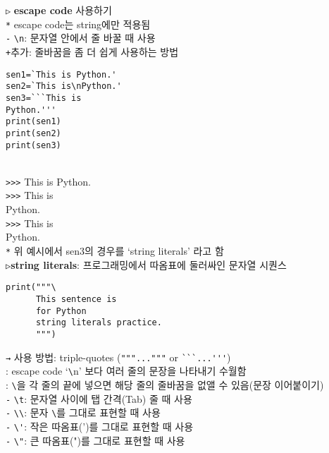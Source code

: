 \documentclass[11pt,a4paper]{article}
\begin{document}
\begin{spacing}{1.5}
\texttt{▷} \textbf{escape code} 사용하기\\
\hspace*{2em}\texttt{*} escape code는 string에만 적용됨\\
\texttt{-} \verb|\n|: 문자열 안에서 줄 바꿀 때 사용\\
\hspace*{2em}\texttt{+}추가: 줄바꿈을 좀 더 쉽게 사용하는 방법\\
\begin{lstlisting}[label={list:first},caption=escape code -- 줄 바꾸기]
sen1=`This is Python.'
sen2=`This is\nPython.'
sen3=```This is
Python.'''
print(sen1)
print(sen2)
print(sen3)
\end{lstlisting}\\
\verb|>>>| This is Python.\\
\verb|>>>| This is\\
Python.\\
\verb|>>>| This is\\
Python.\\

\hspace*{4em}\texttt{*} 위 예시에서 sen3의 경우를 `string literals' 라고 함\\
\hspace*{4em}\texttt{▷}\textbf{string literals}: 프로그래밍에서 따옴표에 둘러싸인 문자열 시퀀스
\begin{lstlisting}[label={list:first},caption=string literals]
print("""\
      This sentence is
      for Python
      string literals practice.
      """)
\end{lstlisting}
\hspace*{4em}\texttt{→} 사용 방법: triple-quotes (\verb|"""..."""| or \verb|```...'''|)\\
\hspace*{4em} : escape code `\verb|\|n' 보다 여러 줄의 문장을 나타내기 수월함\\
\hspace*{4em} : \verb|\|을 각 줄의 끝에 넣으면 해당 줄의 줄바꿈을 없앨 수 있음(문장 이어붙이기)\\

\texttt{-} \verb|\t|: 문자열 사이에 탭 간격(Tab) 줄 때 사용\\
\texttt{-} \verb|\\|: 문자 \verb|\|를 그대로 표현할 때 사용\\
\texttt{-} \verb|\'|: 작은 따옴표(')를 그대로 표현할 때 사용\\
\texttt{-} \verb|\"|: 큰 따옴표(")를 그대로 표현할 때 사용
\end{spacing}
\end{document}
